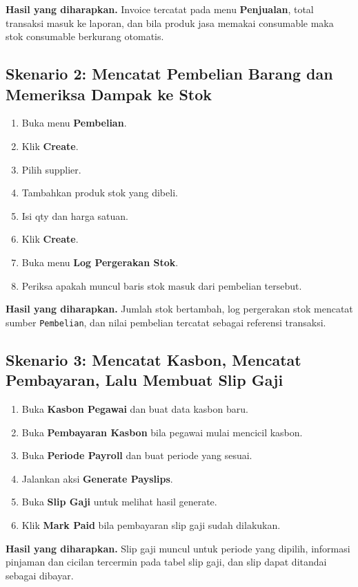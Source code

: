 \documentclass[12pt,a4paper]{article}
\begin{document}
\textbf{Hasil yang diharapkan.} Invoice tercatat pada menu \textbf{Penjualan}, total transaksi masuk ke laporan, dan bila produk jasa memakai consumable maka stok consumable berkurang otomatis.

\subsection{Skenario 2: Mencatat Pembelian Barang dan Memeriksa Dampak ke Stok}
\begin{enumerate}
    \item Buka menu \textbf{Pembelian}.
    \item Klik \textbf{Create}.
    \item Pilih supplier.
    \item Tambahkan produk stok yang dibeli.
    \item Isi qty dan harga satuan.
    \item Klik \textbf{Create}.
    \item Buka menu \textbf{Log Pergerakan Stok}.
    \item Periksa apakah muncul baris stok masuk dari pembelian tersebut.
\end{enumerate}

\textbf{Hasil yang diharapkan.} Jumlah stok bertambah, log pergerakan stok mencatat sumber \texttt{Pembelian}, dan nilai pembelian tercatat sebagai referensi transaksi.

\subsection{Skenario 3: Mencatat Kasbon, Mencatat Pembayaran, Lalu Membuat Slip Gaji}
\begin{enumerate}
    \item Buka \textbf{Kasbon Pegawai} dan buat data kasbon baru.
    \item Buka \textbf{Pembayaran Kasbon} bila pegawai mulai mencicil kasbon.
    \item Buka \textbf{Periode Payroll} dan buat periode yang sesuai.
    \item Jalankan aksi \textbf{Generate Payslips}.
    \item Buka \textbf{Slip Gaji} untuk melihat hasil generate.
    \item Klik \textbf{Mark Paid} bila pembayaran slip gaji sudah dilakukan.
\end{enumerate}

\textbf{Hasil yang diharapkan.} Slip gaji muncul untuk periode yang dipilih, informasi pinjaman dan cicilan tercermin pada tabel slip gaji, dan slip dapat ditandai sebagai dibayar.
\end{document}
